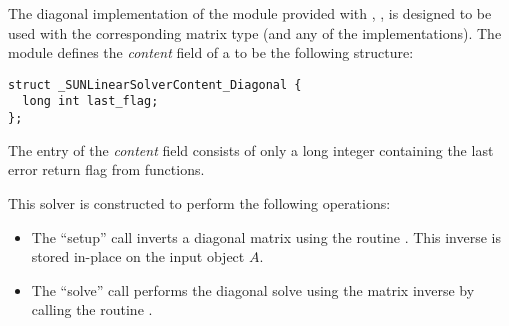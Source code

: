
The diagonal implementation of the {\sunlinsol} module provided with
{\sundials}, {\sunlinsoldiag}, is designed to be used with the
corresponding {\sunmatdiag} matrix type (and any of the {\nvector}
implementations).  The {\sunlinsoldiag} module defines the
{\em content} field of a  to be the following
structure:
\begin{verbatim} 
struct _SUNLinearSolverContent_Diagonal {
  long int last_flag;
};
\end{verbatim}
The entry of the \emph{content} field consists of only a long integer
containing the last error return flag from {\sunlinsoldiag} functions.

This solver is constructed to perform the following operations:
\begin{itemize}
\item The ``setup'' call inverts a diagonal matrix using the
  {\nvector} routine .  This inverse is stored
  in-place on the input {\sunmatdiag} object $A$.
\item The ``solve'' call performs the diagonal solve using
  the matrix inverse by calling the {\nvector} routine .
\end{itemize}

